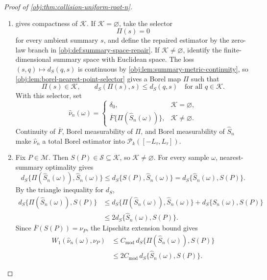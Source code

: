 \documentclass[11pt]{article}
\begin{document}
\begin{proof}[Proof of \cref{obj:thm:collision-uniform-root-n}]
\begin{enumerate}
\item {} gives compactness of
\(\mathcal K\).  If \(\mathcal K=\varnothing\), take the selector
\[
\Pi(s)=0
\]
for every ambient summary \(s\), and define the repaired estimator by the
zero-law branch in \cref{obj:def:summary-space-repair}.  If
\(\mathcal K\ne\varnothing\), identify the finite-dimensional summary space
with Euclidean space.  The loss \((s,q)\mapsto d_S(q,s)\) is continuous by
\cref{obj:lem:summary-metric-continuity}, so
\cref{obj:lem:borel-nearest-point-selector} gives a Borel map \(\Pi\) such
that
\[
\Pi(s)\in\mathcal K,
\qquad
d_S(\Pi(s),s)\le d_S(q,s)
\quad\text{for all }q\in\mathcal K .
\]
With this selector, set
\[
\widehat\nu_n(\omega)
=
\begin{cases}
\delta_0, & \mathcal K=\varnothing,\\
\overline F\{\Pi(\widehat S_n(\omega))\}, & \mathcal K\ne\varnothing .
\end{cases}
\]
Continuity of \(\overline F\), Borel measurability of \(\Pi\), and Borel
measurability of \(\widehat S_n\) make \(\widehat\nu_n\) a total Borel
estimator into \(\mathcal P_k([-L_\tau,L_\tau])\).%

\item Fix \(P\in\mathcal M\).  Then \(S(P)\in\mathscr S\subseteq\mathcal K\),
so \(\mathcal K\ne\varnothing\).  For every sample \(\omega\), nearest-summary
optimality gives
\[
d_S\{\Pi(\widehat S_n(\omega)),\widehat S_n(\omega)\}
\le
d_S\{S(P),\widehat S_n(\omega)\}
=
d_S\{\widehat S_n(\omega),S(P)\}.
\]
By the triangle inequality for \(d_S\),
\[
\begin{aligned}
d_S\{\Pi(\widehat S_n(\omega)),S(P)\}
&\le
d_S\{\Pi(\widehat S_n(\omega)),\widehat S_n(\omega)\}
+d_S\{\widehat S_n(\omega),S(P)\}  \\
&\le
2d_S\{\widehat S_n(\omega),S(P)\}.
\end{aligned}
\]
Since \(\overline F(S(P))=\nu_P\), the Lipschitz extension bound gives
\[
\begin{aligned}
W_1(\widehat\nu_n(\omega),\nu_P)
&\le
C_{\mathrm{mod}}\,
d_S\{\Pi(\widehat S_n(\omega)),S(P)\}  \\
&\le
2C_{\mathrm{mod}}\,d_S\{\widehat S_n(\omega),S(P)\}.
\end{aligned}
\]%


\end{enumerate}
\end{proof}
\end{document}
